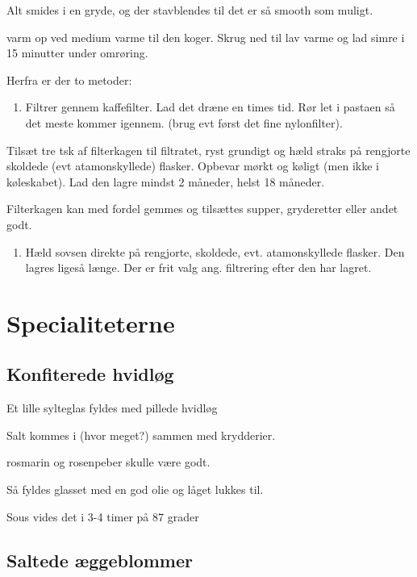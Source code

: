 \documentclass[
]{book}
\providecommand{\tightlist}{%
  \setlength{\itemsep}{0pt}\setlength{\parskip}{0pt}}
\begin{document}
Alt smides i en gryde, og der stavblendes til det er så smooth som muligt.

varm op ved medium varme til den koger. Skrug ned til lav varme og lad simre
i 15 minutter under omrøring.

Herfra er der to metoder:

\begin{enumerate}
\def\labelenumi{\arabic{enumi}.}
\tightlist
\item
  Filtrer gennem kaffefilter. Lad det dræne en times tid. Rør let i pastaen
  så det meste kommer igennem. (brug evt først det fine nylonfilter).
\end{enumerate}

Tilsæt tre tsk af filterkagen til filtratet, ryst grundigt og hæld straks på
rengjorte skoldede (evt atamonskyllede) flasker. Opbevar mørkt og køligt
(men ikke i køleskabet). Lad den lagre mindst 2 måneder, helst 18 måneder.

Filterkagen kan med fordel gemmes og tilsættes supper, gryderetter eller andet godt.

\begin{enumerate}
\def\labelenumi{\arabic{enumi}.}
\setcounter{enumi}{1}
\tightlist
\item
  Hæld sovsen direkte på rengjorte, skoldede, evt. atamonskyllede flasker.
  Den lagres ligeså længe. Der er frit valg ang. filtrering efter den har lagret.
\end{enumerate}

\hypertarget{specialiteterne}{%
\chapter{Specialiteterne}\label{specialiteterne}}

\hypertarget{konfiterede-hvidluxf8g}{%
\section{Konfiterede hvidløg}\label{konfiterede-hvidluxf8g}}

Et lille sylteglas fyldes med pillede hvidløg

Salt kommes i (hvor meget?) sammen med krydderier.

rosmarin og rosenpeber skulle være godt.

Så fyldes glasset med en god olie og låget lukkes til.

Sous vides det i 3-4 timer på 87 grader

\hypertarget{saltede-uxe6ggeblommer}{%
\section{Saltede æggeblommer}\label{saltede-uxe6ggeblommer}}
\end{document}
